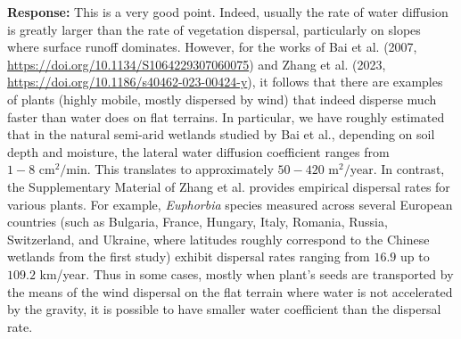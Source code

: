 \documentclass[11pt,a4paper]{article}
\newcommand{\response}[1]{\vspace{0.5em}\noindent\textbf{\textcolor{authorcolor}{Response:}} \textcolor{authorcolor}{#1}}
\begin{document}
\response{This is a very good point. Indeed, usually the rate of water diffusion is greatly larger than the rate of vegetation dispersal, particularly on slopes where surface runoff dominates. However, for the works of Bai et al. (2007, \url{https://doi.org/10.1134/S1064229307060075}) and Zhang et al. (2023, \url{https://doi.org/10.1186/s40462-023-00424-y}), it follows that there are examples of plants (highly mobile, mostly dispersed by wind) that indeed disperse much faster than water does on flat terrains. 
In particular, we have roughly estimated that in the natural semi-arid wetlands studied by Bai et al., depending on soil depth and moisture, the lateral water diffusion coefficient ranges from $1-8 \text{ cm}^2/\text{min}$. This translates to approximately $50-420 \text{ m}^2/\text{year}$. 
In contrast, the Supplementary Material of Zhang et al. provides empirical dispersal rates for various plants. For example, \textit{Euphorbia} species measured across several European countries (such as Bulgaria, France, Hungary, Italy, Romania, Russia, Switzerland, and Ukraine, where latitudes roughly correspond to the Chinese wetlands from the first study) exhibit dispersal rates ranging from $16.9$ up to $109.2$ km/year. 
Thus in some cases, mostly when plant's seeds are transported by the means of the wind dispersal on the flat terrain where water is not accelerated by the gravity, it is possible to have smaller water coefficient than the dispersal rate.}
\end{document}
